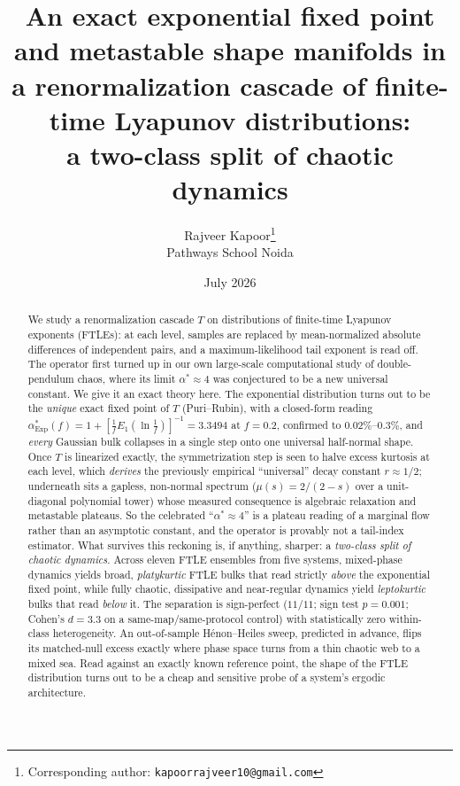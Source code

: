 \documentclass[11pt,a4paper]{article}
\title{\bfseries An exact exponential fixed point and metastable shape manifolds in a
renormalization cascade of finite-time Lyapunov distributions:\\[2mm]
\large a two-class split of chaotic dynamics}
\author{Rajveer Kapoor\thanks{Corresponding author: \texttt{kapoorrajveer10@gmail.com}}\\[3pt]
{\normalsize Pathways School Noida}}
\date{July 2026}
\theoremstyle{remark}
\newcommand{\Exp}{\mathrm{Exp}}
\begin{document}
\maketitle

\begin{abstract}
\noindent
We study a renormalization cascade $T$ on distributions of finite-time Lyapunov exponents (FTLEs):
at each level, samples are replaced by mean-normalized absolute differences of independent pairs, and
a maximum-likelihood tail exponent is read off. The operator first turned up in our own large-scale
computational study of double-pendulum chaos, where its limit $\alpha^*\!\approx\!4$ was conjectured to
be a new universal constant. We give it an exact theory here. The exponential distribution turns out
to be the \emph{unique} exact fixed point of $T$ (Puri--Rubin), with a closed-form reading
$\alpha^*_{\Exp}(f)=1+[\tfrac1f E_1(\ln\tfrac1f)]^{-1}=3.3494$ at $f=0.2$, confirmed to
$0.02\%$--$0.3\%$, and \emph{every} Gaussian bulk collapses in a single step onto one universal
half-normal shape. Once $T$ is linearized exactly, the symmetrization step is seen to halve excess
kurtosis at each level, which \emph{derives} the previously empirical ``universal'' decay constant
$r\approx1/2$; underneath sits a gapless, non-normal spectrum ($\mu(s)=2/(2-s)$ over a unit-diagonal
polynomial tower) whose measured consequence is algebraic relaxation and metastable plateaus. So the
celebrated ``$\alpha^*\!\approx\!4$'' is a plateau reading of a marginal flow rather than an asymptotic
constant, and the operator is provably not a tail-index estimator. What survives this reckoning is, if
anything, sharper: a \emph{two-class split of chaotic dynamics}. Across eleven FTLE ensembles from five
systems, mixed-phase dynamics yields broad, \emph{platykurtic} FTLE bulks that read strictly
\emph{above} the exponential fixed point, while fully chaotic, dissipative and near-regular dynamics
yield \emph{leptokurtic} bulks that read \emph{below} it. The separation is sign-perfect ($11/11$; sign
test $p=0.001$; Cohen's $d=3.3$ on a same-map/same-protocol control) with statistically zero
within-class heterogeneity. An out-of-sample H\'enon--Heiles sweep, predicted in advance, flips its
matched-null excess exactly where phase space turns from a thin chaotic web to a mixed sea. Read
against an exactly known reference point, the shape of the FTLE distribution turns out to be a cheap
and sensitive probe of a system's ergodic architecture.
\end{abstract}
\end{document}
